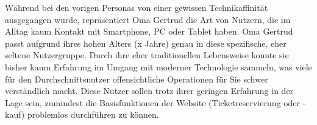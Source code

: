 Während bei den vorigen Personas von einer gewissen Technikaffinität ausgegangen wurde, repräsentiert Oma Gertrud die Art von Nutzern, die im Alltag kaum Kontakt mit Smartphone, PC oder Tablet haben.
Oma Gertrud passt aufgrund ihres hohen Alters (x Jahre) genau in diese spezifische, eher seltene Nutzergruppe. Durch ihre eher traditionellen Lebensweise konnte sie bisher kaum Erfahrung im Umgang mit moderner Technologie
sammeln, was viele für den Durchschnittsnutzer offensichtliche Operationen für Sie schwer verständlich macht.
Diese Nutzer sollen trotz ihrer geringen Erfahrung in der Lage sein, zumindest die Basisfunktionen der Website (Ticketreservierung oder -kauf) problemlos durchführen zu können.